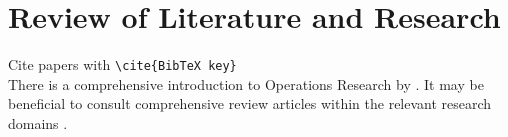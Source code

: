 \chapter{Review of Literature and Research}\label{chapter:Review of Literature and Research}
Cite papers with \verb+\cite{BibTeX key}+\\
There is a comprehensive introduction to Operations Research by \citet{Winston.2007}.
It may be beneficial to consult comprehensive review articles within the relevant research domains 
\citep{Dekker.2012, Matl.2018, Zhang.2023}.
